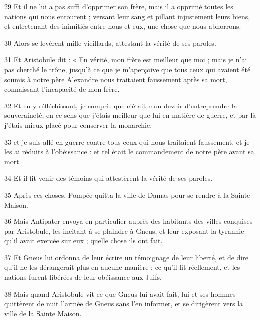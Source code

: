 \par 29 Et il ne lui a pas suffi d'opprimer son frère, mais il a opprimé toutes les nations qui nous entourent ; versant leur sang et pillant injustement leurs biens, et entretenant des inimitiés entre nous et eux, une chose que nous abhorrons.

\par 30 Alors se levèrent mille vieillards, attestant la vérité de ses paroles.

\par 31 Et Aristobule dit : « En vérité, mon frère est meilleur que moi ; mais je n'ai pas cherché le trône, jusqu'à ce que je m'aperçoive que tous ceux qui avaient été soumis à notre père Alexandre nous traitaient faussement après sa mort, connaissant l'incapacité de mon frère.

\par 32 Et en y réfléchissant, je compris que c'était mon devoir d'entreprendre la souveraineté, en ce sens que j'étais meilleur que lui en matière de guerre, et par là j'étais mieux placé pour conserver la monarchie.

\par 33 et je suis allé en guerre contre tous ceux qui nous traitaient faussement, et je les ai réduits à l'obéissance : et tel était le commandement de notre père avant sa mort.

\par 34 Et il fit venir des témoins qui attestèrent la vérité de ses paroles.

\par 35 Après ces choses, Pompée quitta la ville de Damas pour se rendre à la Sainte Maison.

\par 36 Mais Antipater envoya en particulier auprès des habitants des villes conquises par Aristobule, les incitant à se plaindre à Gneus, et leur exposant la tyrannie qu'il avait exercée sur eux ; quelle chose ils ont fait.

\par 37 Et Gneus lui ordonna de leur écrire un témoignage de leur liberté, et de dire qu'il ne les dérangerait plus en aucune manière ; ce qu'il fit réellement, et les nations furent libérées de leur obéissance aux Juifs.

\par 38 Mais quand Aristobule vit ce que Gneus lui avait fait, lui et ses hommes quittèrent de nuit l'armée de Gneus sans l'en informer, et se dirigèrent vers la ville de la Sainte Maison.

